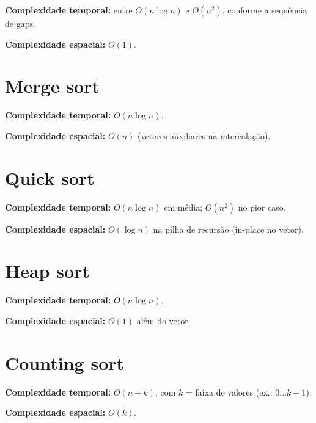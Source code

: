 \textbf{Complexidade temporal:} entre $O(n \log n)$ e $O(n^2)$, conforme a sequência de gaps.

\textbf{Complexidade espacial:} $O(1)$.


\newpage
\section{Merge sort}

\textbf{Complexidade temporal:} $O(n \log n)$.

\textbf{Complexidade espacial:} $O(n)$ (vetores auxiliares na intercalação).


\section{Quick sort}

\textbf{Complexidade temporal:} $O(n \log n)$ em média; $O(n^2)$ no pior caso.

\textbf{Complexidade espacial:} $O(\log n)$ na pilha de recursão (in-place no vetor).


\section{Heap sort}

\textbf{Complexidade temporal:} $O(n \log n)$.

\textbf{Complexidade espacial:} $O(1)$ além do vetor.


\newpage
\section{Counting sort}

\textbf{Complexidade temporal:} $O(n + k)$, com $k$ = faixa de valores (ex.: $0 \ldots k-1$).

\textbf{Complexidade espacial:} $O(k)$.

